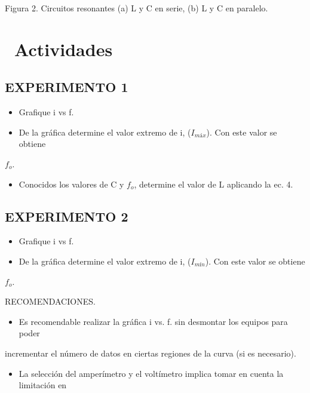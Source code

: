 \documentclass[11pt,a4paper]{article}
\newcommand{\iconotexto}[2]{\textcolor{cyanNeon}{\faIcon{#1}}~#2}
\begin{document}
Figura 2. Circuitos resonantes (a) L y C en serie, (b) L y C en paralelo.

\section{\iconotexto{calculator}{Actividades}}

\subsection*{EXPERIMENTO 1}

\begin{itemize}[leftmargin=1.4em,itemsep=2pt,topsep=3pt]
  \item Grafique i vs f.
  \item De la gráfica determine el valor extremo de i, ($I_{máx}$). Con este valor se obtiene
\end{itemize}

$f_o$.

\begin{itemize}[leftmargin=1.4em,itemsep=2pt,topsep=3pt]
  \item Conocidos los valores de C y $f_o$, determine el valor de L aplicando la ec. 4.
\end{itemize}

\subsection*{EXPERIMENTO 2}

\begin{itemize}[leftmargin=1.4em,itemsep=2pt,topsep=3pt]
  \item Grafique i vs f.
  \item De la gráfica determine el valor extremo de i, ($I_{mín}$). Con este valor se obtiene
\end{itemize}

$f_o$.

RECOMENDACIONES.

\begin{itemize}[leftmargin=1.4em,itemsep=2pt,topsep=3pt]
  \item Es recomendable realizar la gráfica i vs. f. sin desmontar los equipos para poder
\end{itemize}

incrementar el número de datos en ciertas regiones de la curva (si es necesario).

\begin{itemize}[leftmargin=1.4em,itemsep=2pt,topsep=3pt]
  \item La selección del amperímetro y el voltímetro implica tomar en cuenta la limitación en
\end{itemize}
\end{document}
